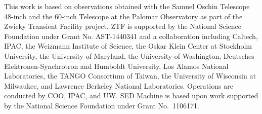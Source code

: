 \documentclass[twocolumn]{aastex631}
\newcommand{\sn}{SN\,2022joj}
\begin{document}
\begin{CJK*}{UTF8}{gbsn}



This work is based on observations obtained with the Samuel Oschin Telescope 48-inch and the 60-inch Telescope at the Palomar Observatory as part of the Zwicky Transient Facility project. ZTF is supported by the National Science Foundation under Grant No. AST-1440341 and a collaboration including Caltech, IPAC, the Weizmann Institute of Science, the Oskar Klein Center at Stockholm University, the University of Maryland, the University of Washington, Deutsches Elektronen-Synchrotron and Humboldt University, Los Alamos National Laboratories, the TANGO Consortium of Taiwan, the University of Wisconsin at Milwaukee, and Lawrence Berkeley National Laboratories. Operations are conducted by COO, IPAC, and UW. 
SED Machine is based upon work supported by the National Science Foundation under Grant No.\ 1106171.



\end{CJK*}
\end{document}
